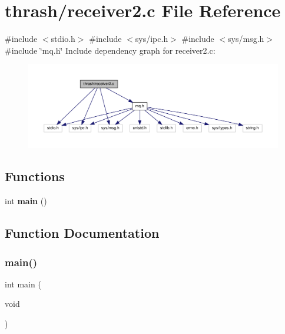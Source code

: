 \section{thrash/receiver2.c File Reference}
\label{receiver2_8c}
{\ttfamily \#include $<$stdio.\+h$>$}\newline
{\ttfamily \#include $<$sys/ipc.\+h$>$}\newline
{\ttfamily \#include $<$sys/msg.\+h$>$}\newline
{\ttfamily \#include \char`\"{}mq.\+h\char`\"{}}\newline
Include dependency graph for receiver2.\+c\+:\nopagebreak
\begin{figure}[H]
\begin{center}
\leavevmode
\includegraphics[width=350pt]{receiver2_8c__incl}
\end{center}
\end{figure}
\subsection*{Functions}
\begin{DoxyCompactItemize}
\item 
int \textbf{ main} ()
\end{DoxyCompactItemize}


\subsection{Function Documentation}
\mbox{\label{receiver2_8c_ae66f6b31b5ad750f1fe042a706a4e3d4}} 
\subsubsection{main()}
{\footnotesize\ttfamily int main (\begin{DoxyParamCaption}\item[{void}]{ }\end{DoxyParamCaption})}


